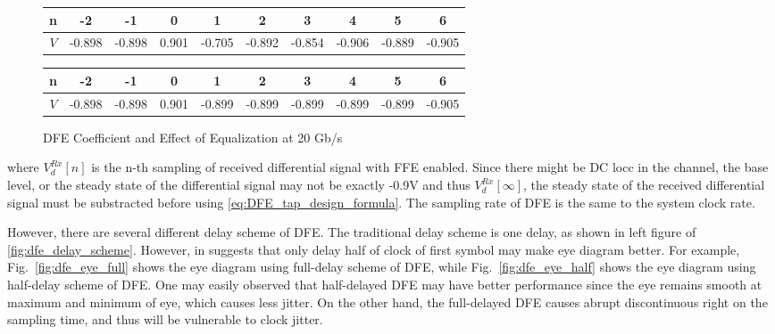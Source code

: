 \documentclass{book}  %
\begin{document}
\begin{paper}
\begin{figure}
	\begin{minipage}[tb]{\textwidth}
		\centering	
		\begin{tabular}{|c|c|c|c|c|c|c|c|c|c|}\hline
			n  &   -2   &   -1   &   0   &    1   &    2   &    3   &    4   &    5   &    6   \\ \hline 
			$V$ & -0.898 & -0.898 & 0.901 & -0.705 & -0.892 & -0.854 & -0.906 & -0.889 & -0.905 \\ \hline 
		\end{tabular}
		\label{table:20G_rxdiff_sample_wo_DFE}
	\end{minipage}	
	\begin{minipage}[tb]{\textwidth}
		\centering	
		\begin{tabular}{|c|c|c|c|c|c|c|c|c|c|}\hline
			n  &   -2   &   -1   &   0   &    1   &    2   &    3   &    4   &    5   &    6   \\ \hline 
			$V$ & -0.898 & -0.898 & 0.901 & -0.899 & -0.899 & -0.899 & -0.899 & -0.899 & -0.905 \\ \hline 
		\end{tabular}
		\label{table:20G_rxdiff_sample_w__DFE} 
	\end{minipage}
	\caption{DFE Coefficient and Effect of Equalization at 20 Gb/s}
\end{figure}

where $V_d^{Rx}[n]$ is the n-th sampling of received differential signal with FFE enabled. Since there might be DC locc in the channel, the base level, or the steady state of the differential signal may not be exactly -0.9V and thus $V_d^{Rx}[\infty]$, the steady state of the received differential signal must be substracted before using \ref{eq:DFE_tap_design_formula}. The sampling rate of DFE is the same to the system clock rate.

However, there are several different delay scheme of DFE. The traditional delay scheme is one delay, as shown in left figure of \ref{fig:dfe_delay_scheme}. However, in \cite{na_energy_efficient, na_microsoft_powerpoint} suggests that only delay half of clock of first symbol may make eye diagram better. For example, Fig.~\ref{fig:dfe_eye_full} shows the eye diagram using full-delay scheme of DFE, while Fig.~\ref{fig:dfe_eye_half} shows the eye diagram using half-delay scheme of DFE. One may easily observed that half-delayed DFE may have better performance since the eye remains smooth at maximum and minimum of eye, which causes less jitter. On the other hand, the full-delayed DFE causes abrupt discontinuous right on the sampling time, and thus will be vulnerable to clock jitter. 


\end{paper}
\end{document}
